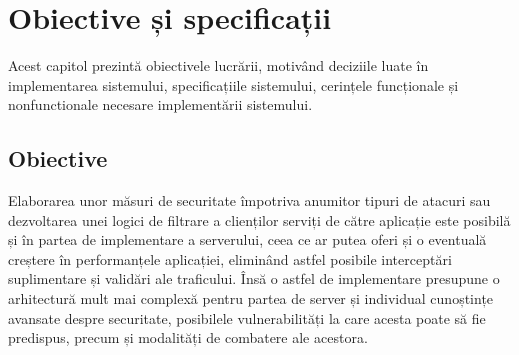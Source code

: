 
 \chapter{Obiective și specificații}
\label{cap:obiective-specificatii}

%

Acest capitol prezintă obiectivele lucrării, motivând deciziile luate în implementarea sistemului, specificațiile sistemului, cerințele funcționale și nonfunctionale necesare implementării sistemului. 

 \section{Obiective}
%
Elaborarea unor măsuri de securitate împotriva anumitor tipuri de atacuri sau dezvoltarea unei logici de filtrare a clienților serviți de către aplicație este posibilă și în partea de implementare a serverului, ceea ce ar putea oferi și o eventuală creștere în performanțele aplicației, eliminând astfel posibile interceptări suplimentare și validări ale traficului. Însă o astfel de implementare presupune o arhitectură mult mai complexă pentru partea de server și individual cunoștințe avansate despre securitate, posibilele vulnerabilități la care acesta poate să fie predispus, precum și modalități de combatere ale acestora.  
  
